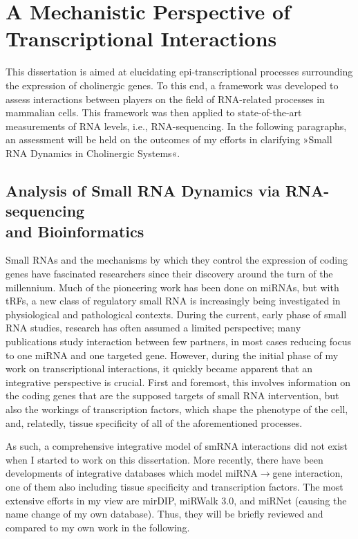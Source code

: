 \section[A Mechanistic Perspective of Transcriptional Interactions]{A Mechanistic Perspective of \\Transcriptional Interactions}

This dissertation is aimed at elucidating epi-transcriptional processes surrounding the expression of cholinergic genes. To this end, a framework was developed to assess interactions between players on the field of RNA-related processes in mammalian cells. This framework was then applied to state-of-the-art measurements of RNA levels, i.e., RNA-sequencing. In the following paragraphs, an assessment will be held on the outcomes of my efforts in clarifying »Small RNA Dynamics in Cholinergic Systems«.

\subsection{Analysis of Small RNA Dynamics via RNA-sequencing \\and Bioinformatics}
Small RNAs and the mechanisms by which they control the expression of coding genes have fascinated researchers since their discovery around the turn of the millennium. Much of the pioneering work has been done on miRNAs, but with tRFs, a new class of regulatory small RNA is increasingly being investigated in physiological and pathological contexts. During the current, early phase of small RNA studies, research has often assumed a limited perspective; many publications study interaction between few partners, in most cases reducing focus to one miRNA and one targeted gene. However, during the initial phase of my work on transcriptional interactions, it quickly became apparent that an integrative perspective is crucial. First and foremost, this involves information on the coding genes that are the supposed targets of small RNA intervention, but also the workings of transcription factors, which shape the phenotype of the cell, and, relatedly, tissue specificity of all of the aforementioned processes.

As such, a comprehensive integrative model of smRNA interactions did not exist when I started to work on this dissertation. More recently, there have been developments of integrative databases which model miRNA$\to$gene interaction, one of them also including tissue specificity and transcription factors. The most extensive efforts in my view are mirDIP, miRWalk 3.0, and miRNet (causing the name change of my own database). Thus, they will be briefly reviewed and compared to my own work in the following.

